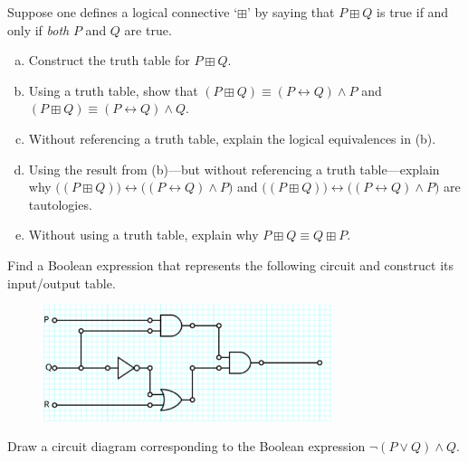 \documentclass[11pt,letterpaper]{article}
\begin{document}
\newpage



 Suppose one defines a logical connective `$\boxplus$' by saying that $P \boxplus Q$ is true if and only if \textit{both} $P$ and $Q$ are true.
	\begin{enumerate}[(a)]
	\item Construct the truth table for $P \boxplus Q$.
	\item Using a truth table, show that $(P \boxplus Q) \equiv (P \leftrightarrow Q) \wedge P$ and $(P \boxplus Q) \equiv (P \leftrightarrow Q) \wedge Q$.
	\item Without referencing a truth table, explain the logical equivalences in (b).
	\item Using the result from (b)---but without referencing a truth table---explain why $\big( (P \boxplus Q) \big) \leftrightarrow \big( (P \leftrightarrow Q) \wedge P \big)$ and $\big( (P \boxplus Q) \big) \leftrightarrow \big( (P \leftrightarrow Q) \wedge P \big)$ are tautologies. 
	\item Without using a truth table, explain why $P \boxplus Q \equiv Q \boxplus P$.
	\end{enumerate}



\newpage



 Find a Boolean expression that represents the following circuit and construct its input/output table.
	\begin{figure}[!ht]
	\centering
	\includegraphics[width=0.75\textwidth]{circuit.png}
	\end{figure} 



\newpage



 Draw a circuit diagram corresponding to the Boolean expression $\neg (P \vee Q) \wedge Q$. 



\newpage
\end{document}
